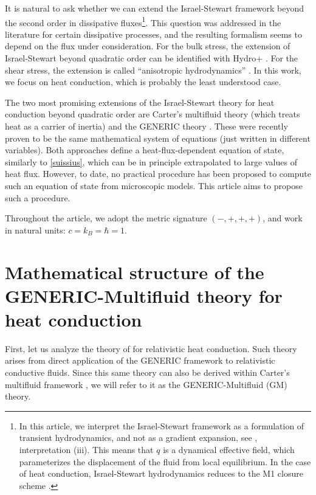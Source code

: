 \documentclass[a4paper, amsfonts, amssymb, amsmath, reprint, showkeys, nofootinbib, twoside, onecolumn, notitlepage]{revtex4-1}
\begin{document}
It is natural to ask whether we can extend the Israel-Stewart framework beyond the second order in dissipative fluxes\footnote{In this article, we interpret the Israel-Stewart framework as a formulation of transient hydrodynamics, and not as a gradient expansion, see \cite{WagnerGavassino2023}, interpretation (iii). This means that $q$ is a dynamical effective field, which parameterizes the displacement of the fluid from local equilibrium. In the case of heat conduction, Israel-Stewart hydrodynamics reduces to the M1 closure scheme \cite{Levermore1981,Sadowski2013,GavassinoRadiazione}.}. This question was addressed in the literature for certain dissipative processes, and the resulting formalism seems to depend on the flux under consideration. For the bulk stress, the extension of Israel-Stewart beyond quadratic order can be identified with Hydro+ \cite{Stephanov:2017ghc,BulkGavassino,GavassinoFarbulk2023}. For the shear stress, the extension is called ``anisotropic hydrodynamics'' \cite{Strickland:2014pga,Alqahtani:2017mhy}. In this work, we focus on heat conduction, which is probably the least understood case. 

The two most promising extensions of the Israel-Stewart theory for heat conduction beyond quadratic order are Carter's multifluid theory \cite{noto_rel,carter1991,lopez2011} (which treats heat as a carrier of inertia) and the GENERIC theory \cite{OttingerSoloHeat1998}. These were recently proven to be the same mathematical system of equations \cite{GavassinoCarterGeneric2023} (just written in different variables). Both approaches define a heat-flux-dependent equation of state, similarly to \eqref{suissius}, which can be in principle extrapolated to large values of heat flux. However, to date, no practical procedure has been proposed to compute such an equation of state from microscopic models. This article aims to propose such a procedure.

Throughout the article, we adopt the metric signature $(-,+,+,+)$, and work in natural units: $c=k_B=\hbar=1$.



\section{Mathematical structure of the GENERIC-Multifluid theory for heat conduction}

First, let us analyze the theory of \citet{OttingerSoloHeat1998} for relativistic heat conduction. Such theory arises from direct application of the GENERIC framework \cite{Grmela1997} to relativistic conductive fluids. Since this same theory can also be derived within Carter's multifluid framework \cite{GavassinoCarterGeneric2023}, we will refer to it as the GENERIC-Multifluid (GM) theory.
\end{document}
